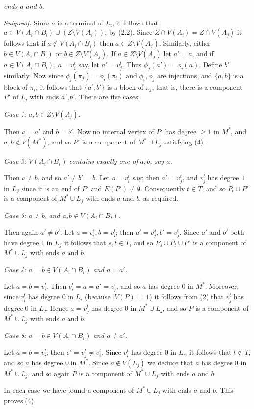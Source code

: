 \noindent \textit{ends $a$ and $b$.}

\textit{Subproof.} Since $a$ is a terminal of $L_i$, it follows that $a \in V(A_i \cap B_i) \cup (Z \setminus V(A_i))$, by (2.2). Since $Z \cap V(A_i) = Z \cap V(A_j)$ it follows that if $a \notin V(A_i \cap B_i)$ then $a \in Z \setminus V(A_j)$. Similarly, either $b \in V(A_i \cap B_i)$ or $b \in Z \setminus V(A_j)$. If $a \in Z \setminus V(A_j)$ let $a' = a$, and if $a \in V(A_i \cap B_i)$, $a = v_i^t$ say, let $a' = v_j^t$. Thus $\phi_j(a') = \phi_i(a)$. Define $b'$ similarly. Now since $\phi_j(\pi_j) = \phi_i(\pi_i)$ and $\phi_i, \phi_j$ are injections, and $\{a, b\}$ is a block of $\pi_i$, it follows that $\{a', b'\}$ is a block of $\pi_j$, that is, there is a component $P'$ of $L_j$ with ends $a', b'$. There are five cases:

\textit{Case 1: $a, b \in Z \setminus V(A_j)$.}

Then $a = a'$ and $b = b'$. Now no internal vertex of $P'$ has degree $\ge 1$ in $M^*$, and $a, b \notin V(M^*)$, and so $P'$ is a component of $M^* \cup L_j$ satisfying (4).

\textit{Case 2: $V(A_i \cap B_i)$ contains exactly one of $a, b$, say $a$.}

Then $a \ne b$, and so $a' \ne b' = b$. Let $a = v_i^t$ say; then $a' = v_j^t$, and $v_j^t$ has degree $1$ in $L_j$ since it is an end of $P'$ and $E(P') \ne \emptyset$. Consequently $t \in T$, and so $P_t \cup P'$ is a component of $M^* \cup L_j$ with ends $a$ and $b$, as required.

\textit{Case 3: $a \ne b$, and $a, b \in V(A_i \cap B_i)$.}

Then again $a' \ne b'$. Let $a = v_i^s, b = v_i^t$; then $a' = v_j^s, b' = v_j^t$. Since $a'$ and $b'$ both have degree $1$ in $L_j$ it follows that $s, t \in T$, and so $P_s \cup P_t \cup P'$ is a component of $M^* \cup L_j$ with ends $a$ and $b$.

\textit{Case 4: $a = b \in V(A_i \cap B_i)$ and $a = a'$.}

Let $a = b = v_i^t$. Then $v_i^t = a = a' = v_j^t$, and so $a$ has degree $0$ in $M^*$. Moreover, since $v_i^t$ has degree $0$ in $L_i$ (because $|V(P)| = 1$) it follows from (2) that $v_j^t$ has degree $0$ in $L_j$. Hence $a = v_j^t$ has degree $0$ in $M^* \cup L_j$, and so $P$ is a component of $M^* \cup L_j$ with ends $a$ and $b$.

\textit{Case 5: $a = b \in V(A_i \cap B_i)$ and $a \ne a'$.}

Let $a = b = v_i^t$; then $a' = v_j^t \ne v_i^t$. Since $v_i^t$ has degree $0$ in $L_i$, it follows that $t \notin T$, and so $a$ has degree $0$ in $M^*$. Since $a \notin V(L_j)$ we deduce that $a$ has degree $0$ in $M^* \cup L_j$, and so again $P$ is a component of $M^* \cup L_j$ with ends $a$ and $b$.

In each case we have found a component of $M^* \cup L_j$ with ends $a$ and $b$. This proves (4).
